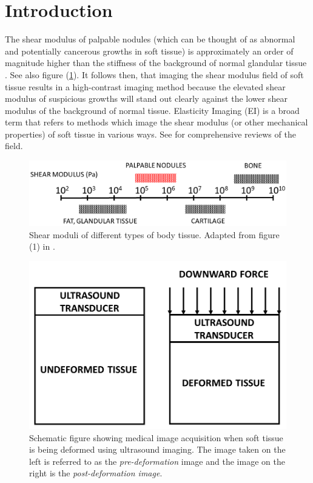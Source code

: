 \documentclass[12pt]{article}
\begin{document}
\section{Introduction}
The shear modulus of palpable nodules (which can be thought of as abnormal and potentially cancerous growths in soft tissue) is approximately an order of magnitude higher than the stiffness of the background of normal glandular tissue \cite{paper:sarv1998}. See also figure (\ref{fig:shearmod}). It follows then, that imaging the shear modulus field of soft tissue results in a high-contrast imaging method because the elevated shear modulus of suspicious growths will stand out clearly against the lower shear modulus of the background of normal tissue. Elasticity Imaging (EI) is a broad term that refers to methods which image the shear modulus (or other mechanical properties) of soft tissue in various ways. See \cite{paper:gao1996,paper:parker2010,book:alamgarra2019,bookchap:oberaibarbone2019} for comprehensive reviews of the field.
%
\begin{figure}[!h]
   \centering
    \includegraphics[totalheight=3cm]{Figures/shearmod_new.png}
  \caption{\label{fig:shearmod} Shear moduli of different types of body tissue. Adapted from figure (1) in \cite{paper:sarv1998}.}
\end{figure}
%
\begin{figure}[!h]
   \centering
    \includegraphics[totalheight=5cm]{Figures/prepostnew.png}
  \caption{\label{fig:prepostimage} Schematic figure showing medical image acquisition when soft tissue is being deformed using ultrasound imaging. The image taken on the left is referred to as the \textit{pre-deformation} image and the image on the right is the \textit{post-deformation image}.}
\end{figure}
%
\end{document}
